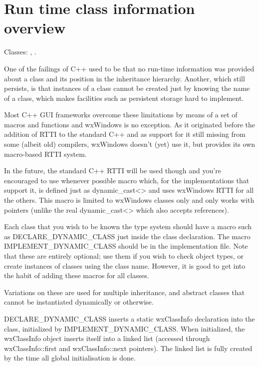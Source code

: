 \section{Run time class information overview}\label{runtimeclassoverview}

Classes: , .

One of the failings of C++ used to be that no run-time information was provided
about a class and its position in the inheritance hierarchy.
Another, which still persists, is that instances of a class cannot be created
just by knowing the name of a class, which makes facilities such as persistent
storage hard to implement.

Most C++ GUI frameworks overcome these limitations by means of a set of
macros and functions and wxWindows is no exception. As it originated before the
addition of RTTI to the standard C++ and as support for it still missing from
some (albeit old) compilers, wxWindows doesn't (yet) use it, but provides its
own macro-based RTTI system.

In the future, the standard C++ RTTI will be used though and you're encouraged
to use whenever possible  macro which,
for the implementations that support it, is defined just as dynamic\_cast<> and
uses wxWindows RTTI for all the others. This macro is limited to wxWindows
classes only and only works with pointers (unlike the real dynamic\_cast<> which
also accepts references).

Each class that you wish to be known the type system should have
a macro such as DECLARE\_DYNAMIC\_CLASS just inside the class declaration.
The macro IMPLEMENT\_DYNAMIC\_CLASS should be in the implementation file.
Note that these are entirely optional; use them if you wish to check object
types, or create instances of classes using the class name. However,
it is good to get into the habit of adding these macros for all classes.

Variations on these  are used for multiple inheritance, and abstract
classes that cannot be instantiated dynamically or otherwise.

DECLARE\_DYNAMIC\_CLASS inserts a static wxClassInfo declaration into the
class, initialized by IMPLEMENT\_DYNAMIC\_CLASS. When initialized, the
wxClassInfo object inserts itself into a linked list (accessed through
wxClassInfo::first and wxClassInfo::next pointers). The linked list
is fully created by the time all global initialisation is done.

